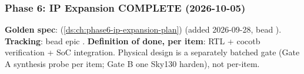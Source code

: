 \begin{record}
{}

\end{record}

\subsubsection{\texorpdfstring{Phase 6: IP Expansion \ok{} COMPLETE
(2026-10-05)}{Phase 6: IP Expansion  COMPLETE (2026-10-05)}}\label{cr:status:phase-status:phase-6-ip-expansion-white-check-mark-complete-2026-10-05}

\begin{record}

\textbf{Golden spec}:  (\cref{ds:ch:phase6-ip-expansion-plan}) (added
2026-09-28, bead ). \textbf{Tracking}: bead epic
. \textbf{Definition of done, per item}:
RTL + cocotb verification + SoC integration. Physical design is a
separately batched gate (Gate A synthesis probe per item; Gate B one
Sky130 harden), not per-item.

{\footnotesize\setlength{\tabcolsep}{3pt}

}
\end{record}
